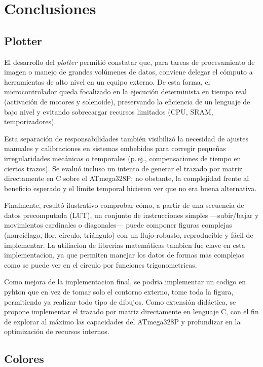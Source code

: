 \section{Conclusiones}

\subsection{Plotter}

El desarrollo del \textit{plotter} permitió constatar que, para tareas de procesamiento de imagen o manejo de grandes volúmenes de datos, conviene delegar el cómputo a herramientas de alto nivel en un equipo externo. De esta forma, el microcontrolador queda focalizado en la ejecución determinista en tiempo real (activación de motores y solenoide), preservando la eficiencia de un lenguaje de bajo nivel y evitando sobrecargar recursos limitados (CPU, SRAM, temporizadores).

Esta separación de responsabilidades también visibilizó la necesidad de ajustes manuales y calibraciones en sistemas embebidos para corregir pequeñas irregularidades mecánicas o temporales (p.\,ej., compensaciones de tiempo en ciertos trazos). Se evaluó incluso un intento de generar el trazado por matriz directamente en C sobre el ATmega328P; no obstante, la complejidad frente al beneficio esperado y el límite temporal hicieron ver que no era buena alternativa.

Finalmente, resultó ilustrativo comprobar cómo, a partir de una secuencia de datos precomputada (LUT), un conjunto de instrucciones simples —subir/bajar y movimientos cardinales o diagonales— puede componer figuras complejas (murciélago, flor, círculo, triángulo) con un flujo robusto, reproducible y fácil de implementar. La utiliacion de librerias matemáticas tambien fue clave en esta implementacion, ya que permiten manejar los datos de formas mas complejas como se puede ver en el circulo por funciones trigonometricas.

Como mejora de la implementacion final, se podria implementar un codigo en pyhton que en vez de tomar solo el contorno externo, tome toda la figura, permitiendo ya realizar todo tipo de dibujos. Como extensión didáctica, se propone implementar el trazado por matriz directamente en lenguaje C, con el fin de explorar al máximo las capacidades del ATmega328P y profundizar en la optimización de recursos internos.

\subsection{Colores}


